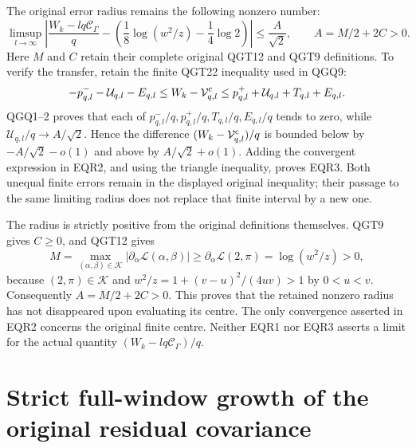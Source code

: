 \documentclass[11pt,a4paper]{article}
\begin{document}
The original error radius remains the following nonzero number:
\begin{equation}\tag{EQR3}
\boxed{\displaystyle
\limsup_{l\to\infty}
\left|
\frac{W_k-lq\mathcal C_\Gamma}{q}
-\left(\frac18\log(w^2/z)-\frac14\log2\right)
\right|
\leq\frac A{\sqrt2},
\qquad A=M/2+2C>0.}
\end{equation}
Here $M$ and $C$ retain their complete original QGT12 and QGT9
definitions. To verify the transfer, retain the finite QGT22
inequality used in QGQ9:
\[
-p^-_{q,l}-\mathcal U_{q,l}-E_{q,l}
\leq W_k-\mathcal V^{\rm c}_{q,l}
\leq p^+_{q,l}+\mathcal U_{q,l}+T_{q,l}+E_{q,l}.
\]
QGQ1--2 proves that each of
$p^-_{q,l}/q,p^+_{q,l}/q,T_{q,l}/q,E_{q,l}/q$ tends to zero,
while $\mathcal U_{q,l}/q\to A/\sqrt2$. Hence the difference
$(W_k-\mathcal V^{\rm c}_{q,l})/q$ is bounded below by
$-A/\sqrt2-o(1)$ and above by $A/\sqrt2+o(1)$.
Adding the convergent expression in EQR2, and using the triangle
inequality, proves EQR3. Both unequal finite errors remain in the
displayed original inequality; their passage to the same limiting
radius does not replace that finite interval by a new one.

The radius is strictly positive from the original definitions
themselves. QGT9 gives $C\geq0$, and QGT12 gives
\[
M=\max_{(\alpha,\beta)\in\mathcal K}
|\partial_\alpha\mathcal L(\alpha,\beta)|
\geq\partial_\alpha\mathcal L(2,\pi)=\log(w^2/z)>0,
\]
because $(2,\pi)\in\mathcal K$ and
$w^2/z=1+(v-u)^2/(4uv)>1$ by $0<u<v$.
Consequently $A=M/2+2C>0$. This proves that the retained
nonzero radius has not disappeared upon evaluating its centre.
The only convergence asserted in EQR2 concerns the original
finite centre. Neither EQR1 nor EQR3 asserts a limit for the
actual quantity $(W_k-lq\mathcal C_\Gamma)/q$.


\clearpage
\section{Strict full-window growth of the original residual covariance}
\label{sec:RWC}
\end{document}

